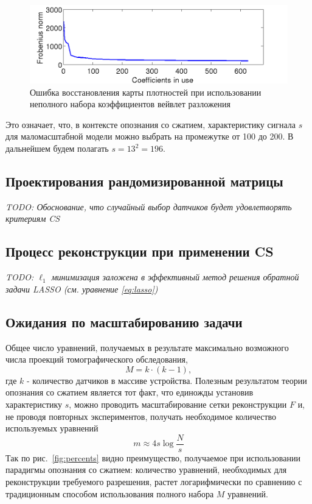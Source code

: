 \documentclass[14pt]{matmex-diploma}
\begin{document}
\begin{figure}[h]
\centering
    \includegraphics[width=1\textwidth]{pics/used_coeff.png}
	\caption{Ошибка восстановления карты плотностей при использовании неполного набора коэффициентов вейвлет разложения}
	\label{fig:used_coeff}
\end{figure}

Это означает, что, в контексте опознания со сжатием, характеристику сигнала $s$ для маломасштабной модели можно выбрать на промежутке от 100 до 200. В дальнейшем будем полагать $s=13^2 = 196 $.




\subsection{Проектирования рандомизированной матрицы}
\textit{TODO: Обоснование, что случайный выбор датчиков будет удовлетворять критериям CS}\\


\subsection{Процесс реконструкции при применении CS}
\textit{TODO: $\ell_1$ минимизация заложена в эффективный метод решения обратной задачи LASSO (см. уравнение \eqref{eq:lasso})}\\

\subsection{Ожидания по масштабированию задачи}
Общее число уравнений, получаемых в результате максимально возможного числа проекций томографического обследования, \[M = k\cdot (k-1),\] где $k$ - количество датчиков в массиве устройства. 
Полезным результатом теории опознания со сжатием является тот факт, что единожды установив характеристику $s$, можно проводить масштабирование сетки реконструкции $F$ и, не проводя повторных экспериментов, получать необходимое количество используемых уравнений
\begin{equation}\label{eq:approx_m}
m \approx 4 s  \log{\frac{N}{s}} 
\end{equation}
Так по рис.~\ref{fig:percents} видно преимущество, получаемое при использовании парадигмы опознания со сжатием: количество уравнений, необходимых для реконструкции требуемого разрешения, растет логарифмически по сравнению с традиционным способом использования полного набора $M$ уравнений.
\end{document}
